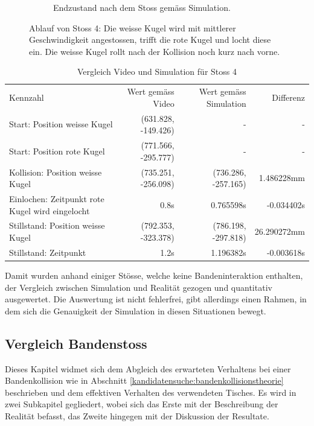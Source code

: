 \begin{figure}[h!]
\begin{subfigure}[t]{0.2\textwidth}
        \caption{Endzustand nach dem Stoss gemäss Simulation.}
        \label{fig:video_13_0030_0034_simulation}
    \end{subfigure}
    \caption{
        Ablauf von Stoss 4: Die weisse Kugel wird mit mittlerer Geschwindigkeit angestossen, trifft die rote Kugel und locht diese ein.
        Die weisse Kugel rollt nach der Kollision noch kurz nach vorne.
    }
    \label{fig:video_13_0030_0034}
\end{figure}

\begin{table}[ht]
    \begin{tabular}{ lrrr }
        \rowcolor{\seccolor!50}
        Kennzahl & Wert gemäss Video & Wert gemäss Simulation & Differenz \\
        Start: Position weisse Kugel & (631.828, -149.426) & - & -\\
        Start: Position rote Kugel & (771.566, -295.777) & - & -\\
        Kollision: Position weisse Kugel & (735.251, -256.098) & (736.286, -257.165) & 1.486228mm\\
        Einlochen: Zeitpunkt rote Kugel wird eingelocht & 0.8s & 0.765598s & -0.034402s\\
        Stillstand: Position weisse Kugel & (792.353, -323.378) & (786.198, -297.818) & 26.290272mm\\
        Stillstand: Zeitpunkt & 1.2s & 1.196382s & -0.003618s\\
    \end{tabular}
    \caption{Vergleich Video und Simulation für Stoss 4}
    \label{tab:video_13_0030_0034}
\end{table}

Damit wurden anhand einiger Stösse, welche keine Bandeninteraktion enthalten,
der Vergleich zwischen Simulation und Realität gezogen und quantitativ ausgewertet.
Die Auswertung ist nicht fehlerfrei, gibt allerdings einen Rahmen, in dem sich die Genauigkeit der Simulation in diesen
Situationen bewegt.

\newpage
\subsection{Vergleich Bandenstoss}
Dieses Kapitel widmet sich dem Abgleich des erwarteten Verhaltens bei einer Bandenkollision wie in
Abschnitt \ref{kandidatensuche:bandenkollisionstheorie} beschrieben und dem effektiven Verhalten des verwendeten Tisches.
Es wird in zwei Subkapitel gegliedert, wobei sich das Erste mit der Beschreibung der Realität befasst, das Zweite hingegen
mit der Diskussion der Resultate.

